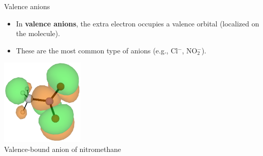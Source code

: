 \documentclass[9pt,t,xcolor=table]{beamer}
\begin{document}
\begin{frame}{\huge Valence anions}\large
    \vspace{5pt}
    \begin{itemize}
        \item In \textbf{valence anions}, the extra electron occupies a valence orbital (localized on the molecule).
        \item These are the most common type of anions (e.g., Cl$^-$, NO$_2^-$).
    \end{itemize}
    \vspace{20pt}
    \centering
    \includegraphics[width=0.3\textwidth]{Figs/MeNO2_VBS.png}\\
	\vspace{3pt}
	\small Valence-bound anion of nitromethane
\end{frame}

\end{document}
